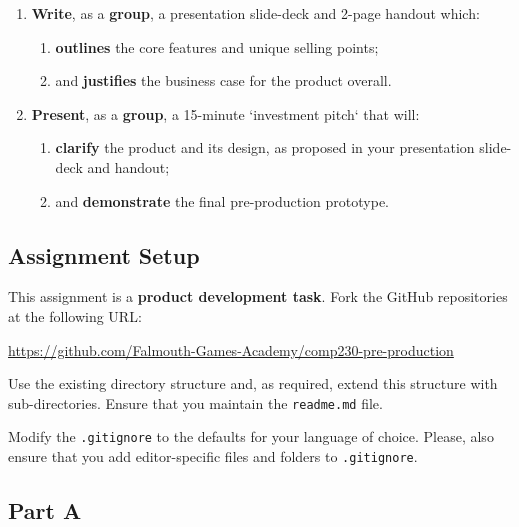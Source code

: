 \documentclass{../fal_assignment}
\begin{document}
\begin{enumerate}[label=(\Alph*)]
\begin{enumerate}[label=\roman*.]
	\end{enumerate}
    \item \textbf{Write}, as a \textbf{group}, a presentation slide-deck and 2-page handout which:
    	\begin{enumerate}[label=\roman*.]
    		\item \textbf{outlines} the core features and unique selling points;
    		\item and \textbf{justifies} the business case for the product overall.
	\end{enumerate}
    \item \textbf{Present}, as a \textbf{group}, a 15-minute `investment pitch` that will:
    	\begin{enumerate}[label=\roman*.]
    		\item \textbf{clarify} the product and its design, as proposed in your presentation slide-deck and handout;
    		\item and \textbf{demonstrate} the final pre-production prototype.
	\end{enumerate}
\end{enumerate}

\subsection*{Assignment Setup}

This assignment is a \textbf{product development task}. Fork the GitHub repositories at the following URL:

\indent \url{https://github.com/Falmouth-Games-Academy/comp230-pre-production}

Use the existing directory structure and, as required, extend this structure with sub-directories. Ensure that you maintain the \texttt{readme.md} file.

Modify the \texttt{.gitignore} to the defaults for your language of choice. Please, also ensure that you add editor-specific files and folders to \texttt{.gitignore}. 


\subsection*{Part A}
\end{document}
